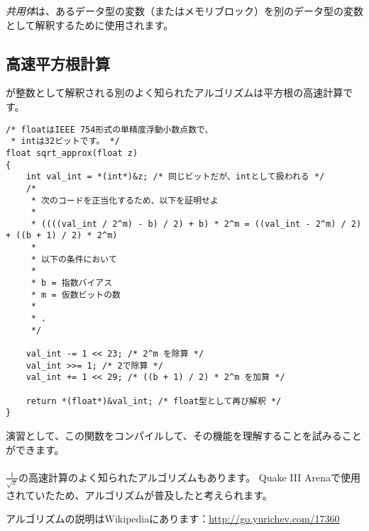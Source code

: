
\CCpp \emph{共用体}は、あるデータ型の変数（またはメモリブロック）を別のデータ型の変数として解釈するために使用されます。





\subsection{高速平方根計算}

\Tfloat が整数として解釈される別のよく知られたアルゴリズムは平方根の高速計算です。

\begin{lstlisting}[caption=ソースコードはウィキペディアから取りました: \url{https://en.wikipedia.org/wiki/Methods_of_computing_square_root},style=customc]
/* floatはIEEE 754形式の単精度浮動小数点数で、
 * intは32ビットです。 */
float sqrt_approx(float z)
{
    int val_int = *(int*)&z; /* 同じビットだが、intとして扱われる */
    /*
     * 次のコードを正当化するため、以下を証明せよ
     *
     * ((((val_int / 2^m) - b) / 2) + b) * 2^m = ((val_int - 2^m) / 2) + ((b + 1) / 2) * 2^m)
     *
     * 以下の条件において
     *
     * b = 指数バイアス
     * m = 仮数ビットの数
     *
     * .
     */
 
    val_int -= 1 << 23; /* 2^m を除算 */
    val_int >>= 1; /* 2で除算 */
    val_int += 1 << 29; /* ((b + 1) / 2) * 2^m を加算 */
 
    return *(float*)&val_int; /* float型として再び解釈 */
}
\end{lstlisting}

演習として、この関数をコンパイルして、その機能を理解することを試みることができます。\\
\\
$\frac{1}{\sqrt{x}}$の高速計算のよく知られたアルゴリズムもあります。
Quake III Arenaで使用されていたため、アルゴリズムが普及したと考えられます。

アルゴリズムの説明はWikipediaにあります：\url{http://go.yurichev.com/17360}


